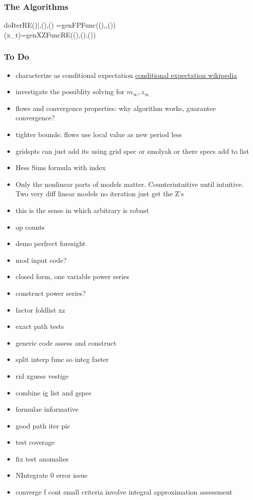 \documentclass[letter]{beamer}
\begin{document}
\begin{frame}
  \frametitle{The Algorithms}

\label{doIterREDef}

 \begin{pseudocode}{doIterRE}{()|\linMod,\modEqns(),\epsDist()}
 \tArg=genFPFunc((),\linMod,\modEqns())\\
 (x_t)=genXZFuncRE((),(),\epsDist())\\
 \end{pseudocode}
 \end{frame}
 \begin{frame}
   \frametitle{To Do}
   \begin{itemize}
   \item characterize as conditional expectation
\href{https://en.wikipedia.org/wiki/Conditional_expectation}{conditional expectation wikipedia}
 \item investigate the possiblity solving for $m_\infty,z_\infty$
   \item flows and convergence properties: why algorithm works, guarantee convergence?
   \item tighter bounds: flows use local value as new period less
   \item gridspts can just add its using grid spec or smolyak or there specs add to list
   \item Hess Sims formula with index
  \item Only the nonlinear parts of models matter.  Counterintuitive until intuitive.  Two very diff linear models no iteration just get the Z's
  \item this is the sense in which arbitrary is robust
   \item op counts
   \item demo perfrect foresight
   \item mod input code?
   \item closed form, one variable power series
   \item construct power series?
   \item factor foldlist xz
   \item exact path tests
   \item generic code assess and construct
   \item split interp func so integ faster
   \item rid xguess vestige
   \item combine ig list and gspec
   \item formulae informative
   \item good path iter pic
   \item test coverage
   \item fix test anomalies
   \item NIntegrate 0 error issue
   \item converge f cont  small criteria involve integral approximation assessment 
   \end{itemize}
 \end{frame}

 
 
\end{document}

